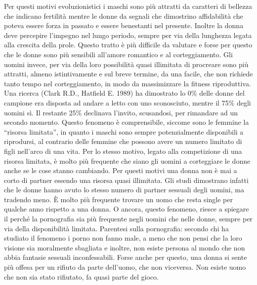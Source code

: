 \documentclass[12pt]{book} %
\begin{document}
Per questi motivi evoluzionistici i maschi sono più attratti da caratteri di bellezza che indicano fertilità mentre le
donne da segnali che dimostrino affidabilità che poteva essere forza in passato e essere benestanti nel presente.
Inoltre la donna deve percepire l'impegno nel lungo periodo, sempre per via della lunghezza legata
alla crescita della prole. Questo tratto è più difficile da valutare e forse per questo che le donne sono più sensibili
all'amore romantico e al corteggiamento. Gli uomini invece, per via della loro possibilità quasi
illimitata di procreare sono più attratti, almeno istintivamente e sul breve termine, da una facile, che non richiede
tanto tempo nel corteggiamento, in modo da massimizzare la fitness riproduttiva. Una ricerca (Clark R.D., Hatfield E.
1989) ha dimostrato lo 0\% delle donne del campione era disposta ad andare a letto con uno sconosciuto, mentre il 75\%
degli uomini sì. Il restante 25\% declinava l'invito, scusandosi, per rimandare ad un secondo
momento. Questo fenomeno è comprensibile, siccome sono le femmine la “risorsa limitata”, in quanto i maschi sono sempre
potenzialmente disponibili a riprodursi, al contrario delle femmine che possono avere un numero limitato di figli
nell'arco di una vita. Per lo stesso motivo, legato alla competizione di una risorsa limitata, è
molto più frequente che siano gli uomini a corteggiare le donne anche se le cose stanno cambiando. Per questi motivi
una donna non è mai a corto di partner essendo una risorsa quasi illimitata. Gli studi dimostrano infatti che le donne
hanno avuto lo stesso numero di partner sessuali degli uomini, ma tradendo meno. È molto più frequente trovare un uomo
che resta single per qualche anno rispetto a una donna. O ancora, questo fenomeno, riesce a spiegare il perché la
pornografia sia più frequente negli uomini che nelle donne, sempre per via della disponibilità limitata. Parentesi
sulla pornografia: secondo chi ha studiato il fenomeno i porno non fanno male, a meno che non pensi che la loro visione
sia moralmente sbagliata e inoltre, non esiste
persona al mondo che non abbia fantasie sessuali inconfessabili. Forse anche per questo, una donna si sente più offesa
per un rifiuto da parte dell'uomo, che non viceversa. Non esiste uomo che non sia stato rifiutato,
fa quasi parte del gioco.
\end{document}

